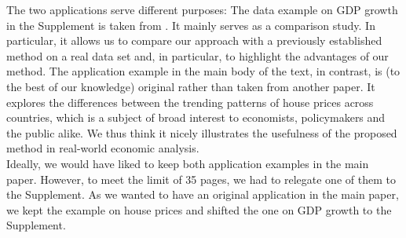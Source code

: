 \documentclass[a4paper,12pt]{article}
\begin{document}
\begin{enumerate}[label=\arabic*.,leftmargin=0.6cm]
The two applications serve different purposes:
The data example on GDP growth in the Supplement is taken from \cite{Zhang2012}. It mainly serves as a comparison study. In particular, it allows us to compare our approach with a previously established method on a real data set and, in particular, to highlight the advantages of our method. 
The application example in the main body of the text, in contrast, is (to the best of our knowledge) original rather than taken from another paper. It explores the differences between the trending patterns of house prices across countries, which is a subject of broad interest to economists, policymakers and the public alike. We thus think it nicely illustrates the usefulness of the proposed method in real-world economic analysis. \\
Ideally, we would have liked to keep both application examples in the main paper. However, to meet the limit of 35 pages, we had to relegate one of them to the Supplement. As we wanted to have an original application in the main paper, we kept the example on house prices and shifted the one on GDP growth to the Supplement. 




\end{enumerate}
\end{document}
